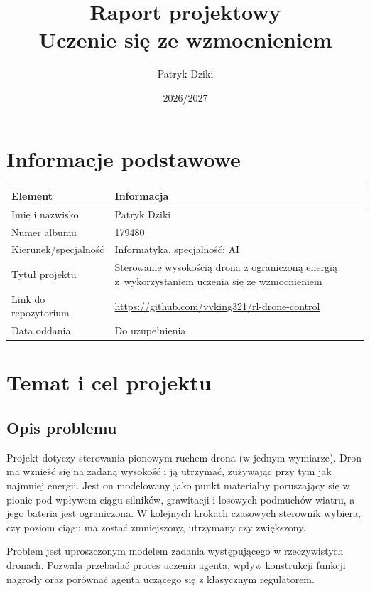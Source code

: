 \documentclass[12pt]{article}
\title{Raport projektowy\\Uczenie się ze wzmocnieniem}
\author{Patryk Dziki}
\date{2026/2027}
\begin{document}
\maketitle
\tableofcontents
\newpage

\section{Informacje podstawowe}

\begin{center}
\begin{tabular}{p{}p{}}
\toprule
Element & Informacja \\
\midrule
Imię i nazwisko & Patryk Dziki \\
Numer albumu & 179480 \\
Kierunek/specjalność & Informatyka, specjalność: AI \\
Tytuł projektu & Sterowanie wysokością drona z ograniczoną energią z~wykorzystaniem uczenia się ze wzmocnieniem \\
Link do repozytorium & \url{https://github.com/vvking321/rl-drone-control} \\
Data oddania & Do uzupełnienia \\
\bottomrule
\end{tabular}
\end{center}

\section{Temat i cel projektu}

\subsection{Opis problemu}

Projekt dotyczy sterowania pionowym ruchem drona (w jednym wymiarze). Dron ma wznieść się na zadaną wysokość i ją utrzymać, zużywając przy tym jak najmniej energii. Jest on modelowany jako punkt materialny poruszający się w pionie pod wpływem ciągu silników, grawitacji i losowych podmuchów wiatru, a jego bateria jest ograniczona. W kolejnych krokach czasowych sterownik wybiera, czy poziom ciągu ma zostać zmniejszony, utrzymany czy zwiększony.

Problem jest uproszczonym modelem zadania występującego w rzeczywistych dronach. Pozwala przebadać proces uczenia agenta, wpływ konstrukcji funkcji nagrody oraz porównać agenta uczącego się z klasycznym regulatorem.
\end{document}
